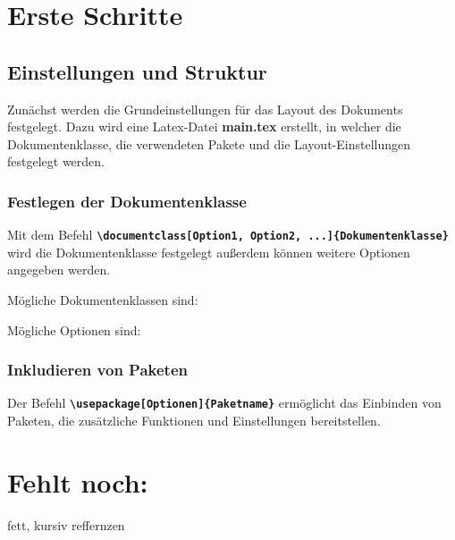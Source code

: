 \section{Erste Schritte}
\subsection{Einstellungen und Struktur}

Zunächst werden die Grundeinstellungen für das Layout des Dokuments festgelegt. Dazu wird eine Latex-Datei \textbf{main.tex} erstellt, in welcher die Dokumentenklasse, die verwendeten Pakete und die Layout-Einstellungen festgelegt werden.

\subsubsection{Festlegen der Dokumentenklasse}
Mit dem Befehl \textbf{\texttt{\textbackslash documentclass[Option1, Option2, ...]\{Dokumentenklasse\}}} wird die Dokumentenklasse festgelegt außerdem können weitere Optionen angegeben werden.

Mögliche Dokumentenklassen sind:


Mögliche Optionen sind:



\subsubsection{Inkludieren von Paketen}
Der Befehl \textbf{\texttt{\textbackslash usepackage[Optionen]\{Paketname\}}} ermöglicht das Einbinden von Paketen, die zusätzliche Funktionen und Einstellungen bereitstellen.





\section{Fehlt noch:}


fett, kursiv
reffernzen
%
